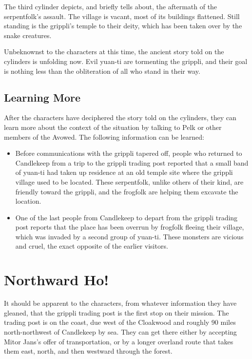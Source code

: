 \documentclass[10pt,a4paper,twoside,bg=print,twocolumn,openany,nodeprecatedcode]{dndbook}
\begin{document}
The third cylinder depicts, and briefly tells about, the aftermath of the serpentfolk's assault. The village is vacant, most of its buildings flattened. Still standing is the grippli's temple to their deity, which has been taken over by the snake creatures.

Unbeknownst to the characters at this time, the ancient story told on the cylinders is unfolding now. Evil yuan-ti are tormenting the grippli, and their goal is nothing less than the obliteration of all who stand in their way.

\subsection{Learning More}
After the characters have deciphered the story told on the cylinders, they can learn more about the context of the situation by talking to Pelk or other members of the Avowed. The following information can be learned:


\begin{itemize}
\item Before communications with the grippli tapered off, people who returned to Candlekeep from a trip to the grippli trading post reported that a small band of yuan-ti had taken up residence at an old temple site where the grippli village used to be located. These serpentfolk, unlike others of their kind, are friendly toward the grippli, and the frogfolk are helping them excavate the location.
\item One of the last people from Candlekeep to depart from the grippli trading post reports that the place has been overrun by frogfolk fleeing their village, which was invaded by a second group of yuan-ti. These monsters are vicious and cruel, the exact opposite of the earlier visitors.
\end{itemize}

\section{Northward Ho!}
It should be apparent to the characters, from whatever information they have gleaned, that the grippli trading post is the first stop on their mission. The trading post is on the coast, due west of the Cloakwood and roughly 90 miles north-northwest of Candlekeep by sea. They can get there either by accepting Mitor Jans's offer of transportation, or by a longer overland route that takes them east, north, and then westward through the forest.
\end{document}
